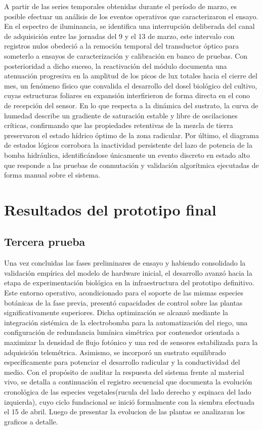 A partir de las series temporales obtenidas durante el período de marzo, es posible efectuar un análisis de los eventos operativos que caracterizaron el ensayo. En el espectro de iluminancia, se identifica una interrupción deliberada del canal de adquisición entre las jornadas del 9 y el 13 de marzo, este intervalo con registros nulos obedeció a la remoción temporal del transductor óptico para someterlo a ensayos de caracterización y calibración en banco de pruebas. Con posterioridad a dicho suceso, la reactivación del módulo documenta una atenuación progresiva en la amplitud de los picos de lux totales hacia el cierre del mes, un fenómeno físico que convalida el desarrollo del dosel biológico del cultivo, cuyas estructuras foliares en expansión interfirieron de forma directa en el cono de recepción del sensor. En lo que respecta a la dinámica del sustrato, la curva de humedad describe un gradiente de saturación estable y libre de oscilaciones críticas, confirmando que las propiedades retentivas de la mezcla de tierra preservaron el estado hídrico óptimo de la zona radicular. Por último, el diagrama de estados lógicos corrobora la inactividad persistente del lazo de potencia de la bomba hidráulica, identificándose únicamente un evento discreto en estado alto que responde a las pruebas de conmutación y validación algorítmica ejecutadas de forma manual sobre el sistema.

\section*{Resultados del prototipo final}

\subsection*{Tercera prueba}
Una vez concluidas las fases preliminares de ensayo y habiendo consolidado la validación empírica del modelo de hardware inicial, el desarrollo avanzó hacia la etapa de experimentación biológica en la infraestructura del prototipo definitivo. Este entorno operativo, acondicionado para el soporte de las mismas especies botánicas de la fase previa, presentó capacidades de control sobre las plantas significativamente superiores. Dicha optimización se alcanzó mediante la integración sistémica de la electrobomba para la automatización del riego, una configuración de redundancia lumínica simétrica por contenedor orientada a maximizar la densidad de flujo fotónico y una red de sensores estabilizada para la adquisición telemétrica. Asimismo, se incorporó un sustrato equilibrado específicamente para potenciar el desarrollo radicular y la conductividad del medio. Con el propósito de auditar la respuesta del sistema frente al material vivo, se detalla a continuación el registro secuencial que documenta la evolución cronológica de las especies vegetales(rucula del lado derecho y espinaca del lado izquierda), cuyo ciclo fundacional se inició formalmente con la siembra efectuada el 15 de abril. Luego de presentar la evolucion de las plantas se analizaran los graficos a detalle.

